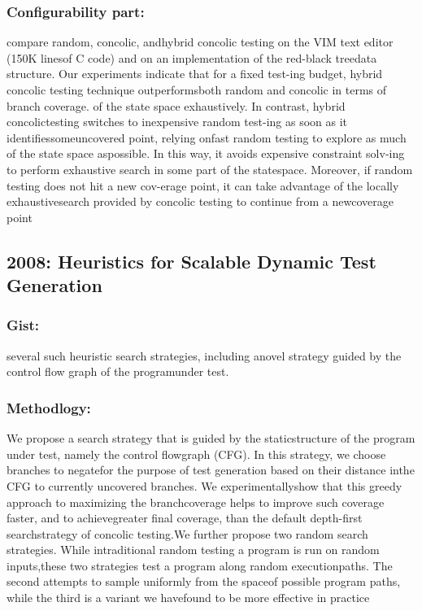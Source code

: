 \documentclass[	runningheads,
				a4paper]{llncs}
\begin{document}
\subsubsection{Configurability part:}
compare random,  concolic,  andhybrid concolic testing on the VIM text editor (150K linesof C code) and on an implementation of the red-black treedata structure. Our experiments indicate that for a fixed test-ing budget, hybrid concolic testing technique outperformsboth random and concolic in terms of branch coverage. of the state space exhaustively. In contrast, hybrid concolictesting switches to inexpensive random test-ing as soon as it identifiessomeuncovered point, relying onfast random testing to explore as much of the state space aspossible.  In this way, it avoids expensive constraint solv-ing to perform exhaustive search in some part of the statespace. Moreover, if random testing does not hit a new cov-erage point, it can take advantage of the locally exhaustivesearch provided by concolic testing to continue from a newcoverage point

\subsection{2008: Heuristics for Scalable Dynamic Test Generation}

\subsubsection{Gist:}
several  such  heuristic  search  strategies,  including  anovel strategy guided by the control flow graph of the programunder test. 

\subsubsection{Methodlogy:}
We  propose  a  search  strategy  that  is  guided  by  the  staticstructure  of  the  program  under  test,  namely  the  control  flowgraph  (CFG).  In  this  strategy,  we  choose  branches  to  negatefor  the  purpose  of  test  generation  based  on  their  distance  inthe CFG to currently uncovered branches. We experimentallyshow  that  this  greedy  approach  to  maximizing  the  branchcoverage helps to improve such coverage faster, and to achievegreater   final   coverage,   than   the   default   depth-first   searchstrategy of concolic testing.We further propose two random search strategies. While intraditional random testing a program is run on random inputs,these  two  strategies  test  a  program  along  random  executionpaths. The second attempts to sample uniformly from the spaceof possible program paths, while the third is a variant we havefound to be more effective in practice
\end{document}
